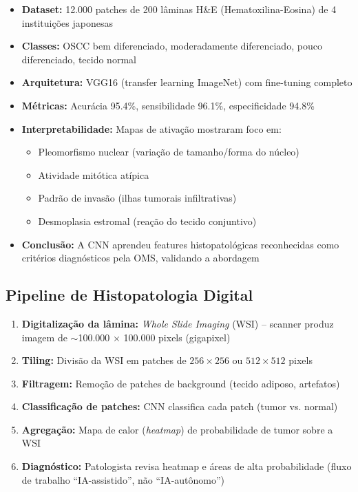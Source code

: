\begin{itemize}
  \item \textbf{Dataset:} 12.000 patches de 200 lâminas H\&E (Hematoxilina-Eosina)
        de 4 instituições japonesas
  \item \textbf{Classes:} OSCC bem diferenciado, moderadamente diferenciado,
        pouco diferenciado, tecido normal
  \item \textbf{Arquitetura:} VGG16 (transfer learning ImageNet) com
        fine-tuning completo
  \item \textbf{Métricas:} Acurácia 95.4\%, sensibilidade 96.1\%, especificidade 94.8\%
  \item \textbf{Interpretabilidade:} Mapas de ativação mostraram foco em:
        \begin{itemize}
          \item Pleomorfismo nuclear (variação de tamanho/forma do núcleo)
          \item Atividade mitótica atípica
          \item Padrão de invasão (ilhas tumorais infiltrativas)
          \item Desmoplasia estromal (reação do tecido conjuntivo)
        \end{itemize}
  \item \textbf{Conclusão:} A CNN aprendeu features histopatológicas reconhecidas
        como critérios diagnósticos pela OMS, validando a abordagem
\end{itemize}

\subsection{Pipeline de Histopatologia Digital}

\begin{enumerate}
  \item \textbf{Digitalização da lâmina:} \textit{Whole Slide Imaging} (WSI) --
        scanner produz imagem de $\sim$100.000 $\times$ 100.000 pixels (gigapixel)
  \item \textbf{Tiling:} Divisão da WSI em patches de $256 \times 256$ ou
        $512 \times 512$ pixels
  \item \textbf{Filtragem:} Remoção de patches de background (tecido adiposo, artefatos)
  \item \textbf{Classificação de patches:} CNN classifica cada patch (tumor vs. normal)
  \item \textbf{Agregação:} Mapa de calor (\textit{heatmap}) de probabilidade de
        tumor sobre a WSI
  \item \textbf{Diagnóstico:} Patologista revisa heatmap e áreas de alta probabilidade
        (fluxo de trabalho ``IA-assistido'', não ``IA-autônomo'')
\end{enumerate}

